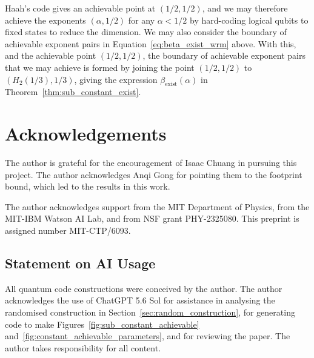 \documentclass{article}
\begin{document}
Haah's code gives an achievable point at $(1/2,1/2)$, and we may therefore achieve the exponents $(\alpha,1/2)$ for any $\alpha < 1/2$ by hard-coding logical qubits to fixed states to reduce the dimension. We may also consider the boundary of achievable exponent pairs in Equation~\eqref{eq:beta_exist_wrm} above. With this, and the achievable point $(1/2,1/2)$, the boundary of achievable exponent pairs that we may achieve is formed by joining the point $(1/2,1/2)$ to $(H_2(1/3), 1/3)$, giving the expression $\beta_{\text{exist}}(\alpha)$ in Theorem~\ref{thm:sub_constant_exist}.


\section*{Acknowledgements}


The author is grateful for the encouragement of Isaac Chuang in pursuing this project. The author acknowledges Anqi Gong for pointing them to the footprint bound, which led to the results in this work. 

The author acknowledges support from the MIT Department of Physics, from the MIT-IBM Watson AI Lab, and from NSF grant PHY-2325080. This preprint is assigned number MIT-CTP/6093.

\subsection*{Statement on AI Usage} All quantum code constructions were conceived by the author. The author acknowledges the use of ChatGPT 5.6 Sol for assistance in analysing the randomised construction in Section~\ref{sec:random_construction}, for generating code to make Figures~\ref{fig:sub_constant_achievable} and~\ref{fig:constant_achievable_parameters}, and for reviewing the paper. The author takes responsibility for all content. 




\printbibliography
\end{document}
